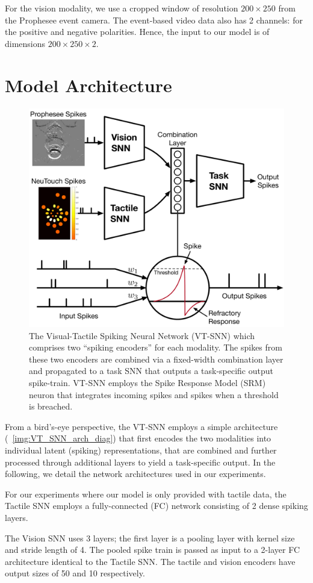 \documentclass[fyp]{socreport}
\begin{document}
For the vision modality, we use a cropped window of resolution $200 \times 250$
from the Prophesee event camera. The event-based video data also has 2 channels:
for the positive and negative polarities. Hence, the input to our model is of
dimensions $200 \times 250 \times 2$.

\section{Model Architecture}

\begin{figure}
  \centering
  \includegraphics[width=0.45\columnwidth]{images/VT-SNN_v3.pdf}
  \caption{The Visual-Tactile Spiking Neural Network (VT-SNN) which comprises two ``spiking encoders'' for each modality. The spikes from these two encoders are combined via a fixed-width combination layer and propagated to a task SNN that outputs a task-specific output spike-train. VT-SNN employs the Spike Response Model (SRM) neuron that integrates incoming spikes and spikes when a threshold is breached.}
  \label{img:VT_SNN_arch_diag}
\end{figure}

From a bird's-eye perspective, the VT-SNN employs a simple architecture (~\autoref{img:VT_SNN_arch_diag}) that
first encodes the two modalities into individual latent (spiking)
representations, that are combined and further processed through additional
layers to yield a task-specific output. In the following, we detail the network
architectures used in our experiments.

For our experiments where our model is only provided with tactile data, the
Tactile SNN employs a fully-connected (FC) network consisting of 2 dense spiking
layers.

The Vision SNN uses 3 layers; the first layer is a pooling layer with kernel
size and stride length of 4. The pooled spike train is passed as input to a
2-layer FC architecture identical to the Tactile SNN. The tactile and vision
encoders have output sizes of 50 and 10 respectively.
\end{document}
